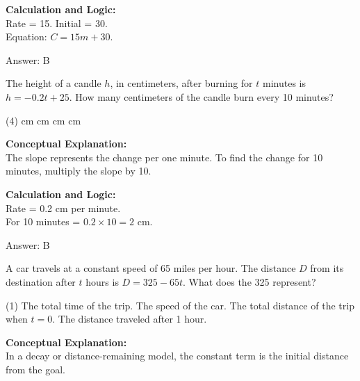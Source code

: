 \documentclass[11pt,paper=a4,answers]{exam}
\begin{document}
\begin{questions}
\begin{solution}
\vspace{10pt}
\textbf{Calculation and Logic:} \\
Rate = 15. Initial = 30. \\
Equation: $C = 15m + 30$.

\vspace{15pt}
Answer: \colorbox{yellow!100}{B}
\end{solution}

\vspace{20pt}

\question
The height of a candle $h$, in centimeters, after burning for $t$ minutes is $h = -0.2t + 25$. How many centimeters of the candle burn every 10 minutes?
\begin{tasks}(4)
     cm
     cm
     cm
     cm
\end{tasks}

\begin{solution}
\textbf{Conceptual Explanation:} \\
The slope represents the change per one minute. To find the change for 10 minutes, multiply the slope by 10.

\vspace{10pt}
\textbf{Calculation and Logic:} \\
Rate = 0.2 cm per minute. \\
For 10 minutes = $0.2 \times 10 = 2$ cm.

\vspace{15pt}
Answer: \colorbox{yellow!100}{B}
\end{solution}

\vspace{20pt}

\question
A car travels at a constant speed of 65 miles per hour. The distance $D$ from its destination after $t$ hours is $D = 325 - 65t$. What does the 325 represent?
\begin{tasks}(1)
    \task The total time of the trip.
    \task The speed of the car.
    \task The total distance of the trip when $t=0$.
    \task The distance traveled after 1 hour.
\end{tasks}

\begin{solution}
\textbf{Conceptual Explanation:} \\
In a decay or distance-remaining model, the constant term is the initial distance from the goal.


\end{solution}
\end{questions}
\end{document}
